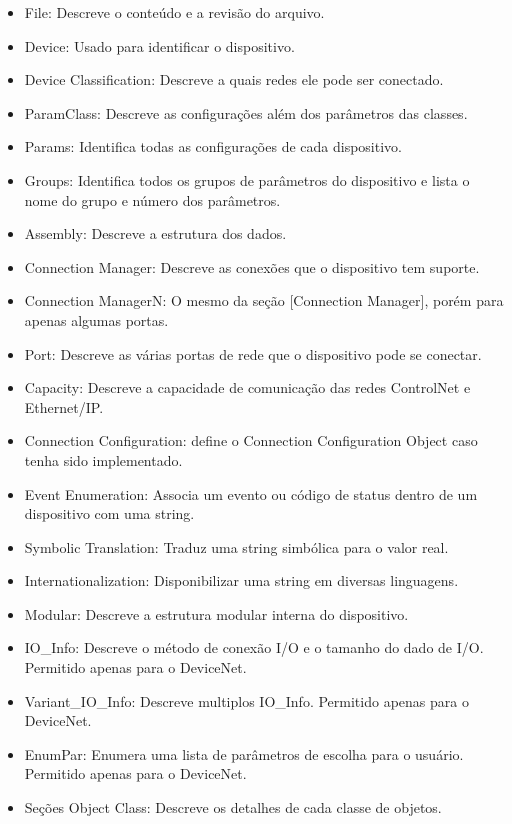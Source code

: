  \begin{itemize}
\item File: Descreve o conteúdo e a revisão do arquivo.
 \item Device: Usado para identificar o dispositivo.
 \item Device Classification: Descreve a quais redes ele pode ser conectado.
 \item ParamClass: Descreve as configurações além dos parâmetros das classes.
\item Params: Identifica todas as configurações de cada dispositivo.
 \item Groups: Identifica todos os grupos de parâmetros do dispositivo e lista o nome do grupo e número dos parâmetros.
 \item Assembly: Descreve a estrutura dos dados.
 \item Connection Manager: Descreve as conexões que o dispositivo tem suporte.
 \item Connection ManagerN: O mesmo da seção [Connection Manager], porém para apenas algumas portas.
 \item Port: Descreve as várias portas de rede que o dispositivo pode se conectar.
 \item Capacity: Descreve a capacidade de comunicação das redes ControlNet e Ethernet/IP.
 \item Connection Configuration: define o Connection Configuration Object caso tenha sido implementado.
 \item Event Enumeration: Associa um evento ou código de status dentro de um dispositivo com uma string.  
 \item Symbolic Translation: Traduz uma string simbólica para o valor real.
 \item Internationalization: Disponibilizar uma string em diversas linguagens.
 \item Modular: Descreve a estrutura modular interna do dispositivo.
 \item IO\_Info: Descreve o método de conexão I/O e o tamanho do dado de I/O. Permitido apenas para o DeviceNet.
 \item Variant\_IO\_Info: Descreve multiplos IO\_Info. Permitido apenas para o DeviceNet.
 \item EnumPar: Enumera uma lista de parâmetros de escolha para o usuário. Permitido apenas para o DeviceNet.
 \item Seções Object Class: Descreve os detalhes de cada classe de objetos.
 \end{itemize}
 
